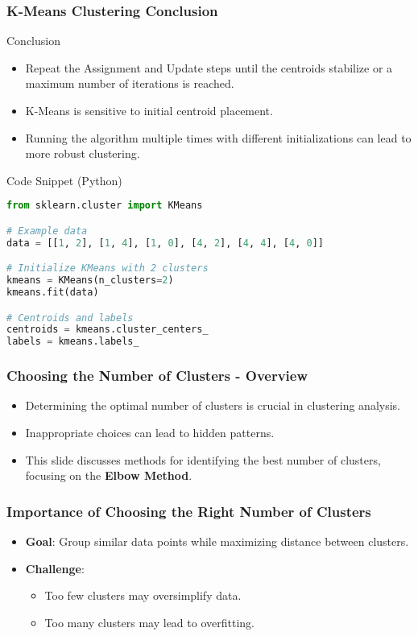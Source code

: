 \documentclass[aspectratio=169]{beamer}
\begin{document}
\begin{frame}[fragile]
    \frametitle{K-Means Clustering Conclusion}
    \begin{block}{Conclusion}
        \begin{itemize}
            \item Repeat the Assignment and Update steps until the centroids stabilize or a maximum number of iterations is reached.
            \item K-Means is sensitive to initial centroid placement.
            \item Running the algorithm multiple times with different initializations can lead to more robust clustering.
        \end{itemize}
    \end{block}

    \begin{block}{Code Snippet (Python)}
        \begin{lstlisting}[language=Python]
from sklearn.cluster import KMeans

# Example data
data = [[1, 2], [1, 4], [1, 0], [4, 2], [4, 4], [4, 0]]

# Initialize KMeans with 2 clusters
kmeans = KMeans(n_clusters=2)
kmeans.fit(data)

# Centroids and labels
centroids = kmeans.cluster_centers_
labels = kmeans.labels_
        \end{lstlisting}
    \end{block}
\end{frame}

\begin{frame}[fragile]
    \frametitle{Choosing the Number of Clusters - Overview}
    \begin{itemize}
        \item Determining the optimal number of clusters is crucial in clustering analysis.
        \item Inappropriate choices can lead to hidden patterns.
        \item This slide discusses methods for identifying the best number of clusters, focusing on the \textbf{Elbow Method}.
    \end{itemize}
\end{frame}

\begin{frame}[fragile]
    \frametitle{Importance of Choosing the Right Number of Clusters}
    \begin{itemize}
        \item \textbf{Goal}: Group similar data points while maximizing distance between clusters.
        \item \textbf{Challenge}: 
        \begin{itemize}
            \item Too few clusters may oversimplify data.
            \item Too many clusters may lead to overfitting.
        \end{itemize}
    \end{itemize}
\end{frame}
\end{document}
